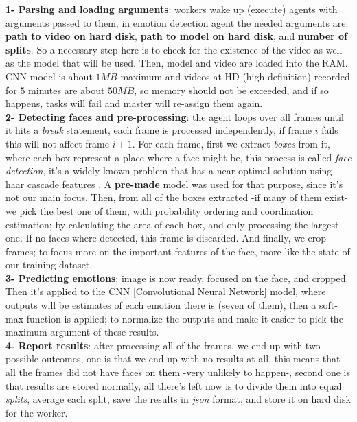 \textbf{1- Parsing and loading arguments}: workers wake up (execute) agents with arguments passed to them, in emotion detection agent the needed arguments are: \textbf{path to video on hard disk}, \textbf{path to model on hard disk}, and \textbf{number of splits}. So a necessary step here is to check for the existence of the video as well as the model that will be used. Then, model and video are loaded into the RAM. CNN model is about $1 MB$ maximum and videos at HD (high definition) recorded for $5$ minutes are about $50 MB$, so memory should not be exceeded, and if so happens, tasks will fail and master will re-assign them again. \\

\textbf{2- Detecting faces and pre-processing}: the agent loops over all frames until it hits a \textit{break} statement, each frame is processed independently, if frame $i$ fails this will not affect frame $i+1$. For each frame, first we extract \textit{boxes} from it, where each box represent a place where a face might be, this process is called \textit{face detection}, it's a widely known problem that has a near-optimal solution using haar cascade features \cite{haar}. A \textbf{pre-made} model was used for that purpose, since it's not our main focus. Then, from all of the boxes extracted -if many of them exist- we pick the best one of them, with probability ordering and coordination estimation; by calculating the area of each box, and only processing the largest one. If no faces where detected, this frame is discarded. And finally, we crop frames; to focus more on the important features of the face, more like the state of our training dataset.\\

\textbf{3- Predicting emotions}: image is now ready, focused on the face, and cropped. Then it's applied to the CNN \ref{Convolutional Neural Network} model, where outputs will be estimates of each emotion there is (seven of them), then a soft-max function is applied; to normalize the outputs and make it easier to pick the maximum argument of these results.\\

\textbf{4- Report results}: after processing all of the frames, we end up with two possible outcomes, one is that we end up with no results at all, this means that all the frames did not have faces on them -very unlikely to happen-, second one is that results are stored normally, all there's left now is to divide them into equal \textit{splits}, average each split, save the results in \textit{json} format, and store it on hard disk for the worker.\\

